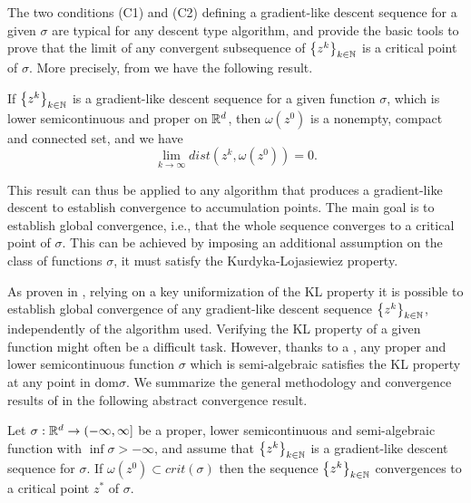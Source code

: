 The two conditions (C1) and (C2) defining a gradient-like descent sequence for a given $\sigma$ are typical for any descent type algorithm, and provide the basic tools to prove that the limit of any convergent subsequence of $\left\lbrace z^k \right\rbrace_{k \in \mathbb{N}}$ is a critical point of $\sigma$. More precisely, from \cite[Lemma 5, p. 476]{BST2014} we have the following result.

\begin{lemma}
If $\left\lbrace z^k \right\rbrace_{k \in \mathbb{N}}$ is a gradient-like descent sequence for a given function $\sigma$, which is lower semicontinuous and proper on $\mathbb{R}^d$, then $\omega\left(z^0\right)$ is a nonempty, compact and connected set, and we have
\begin{equation*}
	\lim_{k\rightarrow \infty} dist\left( z^k, \omega\left(z^0\right)\right) = 0.
\end{equation*}
\end{lemma}

This result can thus be applied to any algorithm that produces a gradient-like descent to establish convergence to accumulation points. The main goal is to establish global convergence, i.e., that the whole sequence converges to a critical point of $\sigma$. This can be achieved by imposing an additional assumption on the class of functions $\sigma$, it must satisfy the Kurdyka-{L}ojasiewiez property.\medskip

As proven in \cite{BST2014}, relying on a key uniformization of the KL property it is possible to establish global convergence of any gradient-like descent sequence $\left\lbrace z^k \right\rbrace_{k \in \mathbb{N}}$, independently of the algorithm used. Verifying the KL property of a given function might often be a difficult task. However, thanks to a , any proper and lower semicontinuous function $\sigma$ which is semi-algebraic satisfies the KL property at any point in dom$\sigma$. We summarize the general methodology and convergence results of \cite{BST2014} in the following abstract convergence result.

\begin{theorem} \label{SDP_SGP_conv_thrm}
Let $\sigma:\mathbb{R}^d \rightarrow (-\infty,\infty]$ be a proper, lower semicontinuous and semi-algebraic function with $\inf \sigma > -\infty$, and assume that $\left\lbrace z^k \right\rbrace_{k \in \mathbb{N}}$ is a gradient-like descent sequence for $\sigma$. If $\omega\left( z^0 \right) \subset crit(\sigma)$ then the sequence $\left\lbrace z^k \right\rbrace_{k \in \mathbb{N}}$ convergences to a critical point $z^{*}$ of $\sigma$.
\end{theorem}

